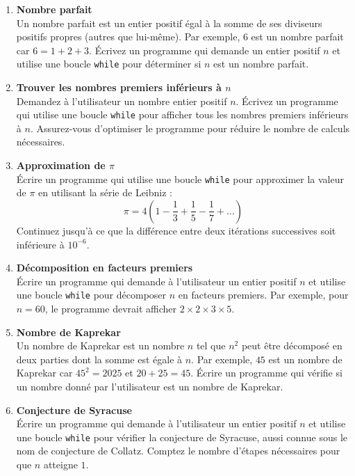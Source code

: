 

\begin{enumerate}

    \item \textbf{Nombre parfait} \\
    Un nombre parfait est un entier positif égal à la somme de ses diviseurs positifs propres (autres que lui-même). Par exemple, $6$ est un nombre parfait car $6 = 1 + 2 + 3$. Écrivez un programme qui demande un entier positif $n$ et utilise une boucle \texttt{while} pour déterminer si $n$ est un nombre parfait.
    
    \item \textbf{Trouver les nombres premiers inférieurs à $n$} \\
    Demandez à l’utilisateur un nombre entier positif $n$. Écrivez un programme qui utilise une boucle \texttt{while} pour afficher tous les nombres premiers inférieurs à $n$. Assurez-vous d’optimiser le programme pour réduire le nombre de calculs nécessaires.
    
    \item \textbf{Approximation de $\pi$} \\
    Écrire un programme qui utilise une boucle \texttt{while} pour approximer la valeur de $\pi$ en utilisant la série de Leibniz :
    \[
    \pi = 4 \left( 1 - \frac{1}{3} + \frac{1}{5} - \frac{1}{7} + \dots \right)
    \]
    Continuez jusqu'à ce que la différence entre deux itérations successives soit inférieure à $10^{-6}$.
    
    \item \textbf{Décomposition en facteurs premiers} \\
    Écrire un programme qui demande à l'utilisateur un entier positif $n$ et utilise une boucle \texttt{while} pour décomposer $n$ en facteurs premiers. Par exemple, pour $n = 60$, le programme devrait afficher $2 \times 2 \times 3 \times 5$.
    
    \item \textbf{Nombre de Kaprekar} \\
    Un nombre de Kaprekar est un nombre $n$ tel que $n^2$ peut être décomposé en deux parties dont la somme est égale à $n$. Par exemple, $45$ est un nombre de Kaprekar car $45^2 = 2025$ et $20 + 25 = 45$. Écrire un programme qui vérifie si un nombre donné par l'utilisateur est un nombre de Kaprekar.
    
    \item \textbf{Conjecture de Syracuse} \\
    Écrire un programme qui demande à l'utilisateur un entier positif $n$ et utilise une boucle \texttt{while} pour vérifier la conjecture de Syracuse, aussi connue sous le nom de conjecture de Collatz. Comptez le nombre d'étapes nécessaires pour que $n$ atteigne $1$.
    

\end{enumerate}
